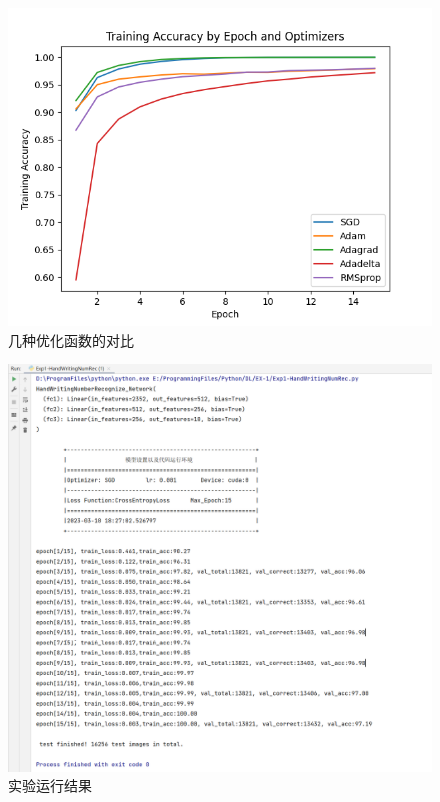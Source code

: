\documentclass{report}
\begin{document}
	\begin{figure}[htbp]
		\centering
		\includegraphics[width=1.\textwidth]{fig/fig3.png}
		\caption{几种优化函数的对比}
		\label{fig:contrast}
	\end{figure}
	
	\begin{figure}[htbp]
		\centering
		\includegraphics[width=1.2\textwidth]{fig/fig1.png}
		\caption{实验运行结果}
		\label{fig:result}
	\end{figure}
	
\end{document}
